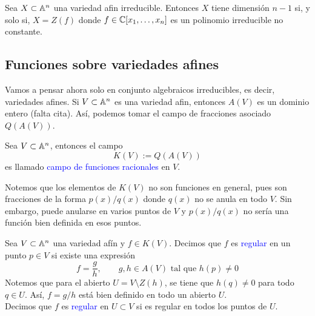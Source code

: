     \begin{propo}
        Sea $X\subset \mathbb{A}^n$ una variedad afin irreducible. Entonces $X$ tiene dimensión $n-1$ si, y solo si, $X=Z(f)$ donde $f\in\mathbb{C}[x_1,\dots,x_n]$ es un polinomio irreducible no constante.
    \end{propo}

\subsection{Funciones sobre variedades afines}

    Vamos a pensar ahora solo en conjunto algebraicos irreducibles, es decir, variedades afines. Si $V\subset\mathbb{A}^n$ es una variedad afin, entonces $A(V)$ es un dominio entero (falta cita). Así, podemos tomar el campo de fracciones asociado $Q(A(V))$.

    \begin{definition}
        Sea $V\subset\mathbb{A}^n$, entonces el campo
        \begin{equation*}
            K(V):=Q(A(V))
        \end{equation*}
        es llamado \textcolor{blue}{campo de funciones racionales} en $V$.
    \end{definition}

    Notemos que los elementos de $K(V)$ no son funciones en general, pues son fracciones de la forma $p(x)/q(x)$ donde $q(x)$ no se anula en todo $V$. Sin embargo, puede anularse en varios puntos de $V$ y $p(x)/q(x)$ no sería una función bien definida en esos puntos.

    \begin{definition}
        Sea $V\subset\mathbb{A}^n$ una variedad afín y $f\in K(V)$. Decimos que $f$ es \textcolor{blue}{regular} en un punto $p\in V$ si existe una expresión 
        \begin{equation*}
            f=\frac{g}{h},\qquad g,h\in A(V)\text{ tal que }h(p)\neq 0
        \end{equation*}
        Notemos que para el abierto $U=V\setminus Z(h)$, se tiene que $h(q)\neq 0$ para todo $q\in U$. Así, $f=g/h$ está bien definido en todo un abierto $U$.\\
        Decimos que $f$ es \textcolor{blue}{regular} en $U\subset V$ si es regular en todos los puntos de $U$.
    \end{definition}

